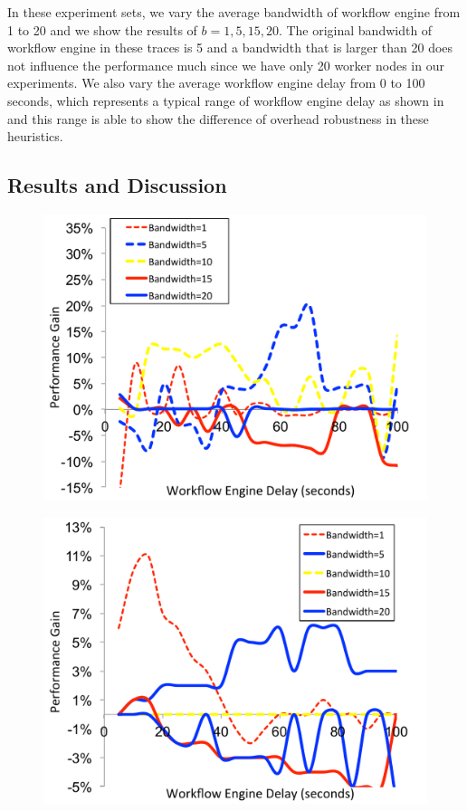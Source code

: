 \documentclass[final]{IEEEtran}
\begin{document}
In these experiment sets, we vary the average bandwidth of workflow engine from 1 to 20 and we show the results of $b=1, 5, 15, 20$. The original bandwidth of workflow engine in these traces is 5 and a bandwidth that is larger than 20 does not influence the performance much since we have only 20 worker nodes in our experiments. We also vary the average workflow engine delay from 0 to 100 seconds, which represents a typical range of workflow engine delay as shown in~\cite{Chen} and this range is able to show the difference of overhead robustness in these heuristics. 

\subsection{Results and Discussion}

\begin{figure}[!htb]
\centering
 \includegraphics[width=0.9\linewidth]{figure/MAX-MIN-Broadband.pdf}
  \label{fig:MAX-MIN-Broadband}
  \vspace{-10pt}
\end{figure}

\begin{figure}[!htb]
\centering
 \includegraphics[width=0.9\linewidth]{figure/MAX-MIN-CyberShake.pdf}
  \label{fig:MAX-MIN-CyberShake}
  \vspace{-10pt}
\end{figure}
\end{document}

